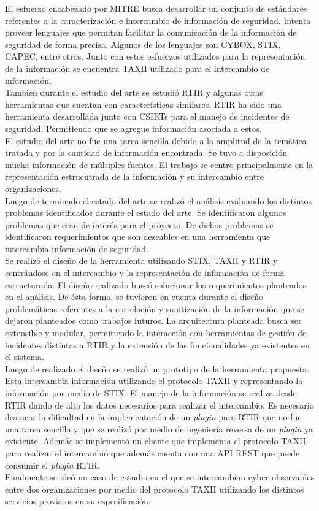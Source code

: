 \bigskip
El esfuerzo encabezado por MITRE busca desarrollar un conjunto de estándares referentes a la caracterización e intercambio de información de seguridad. Intenta proveer lenguajes que permitan facilitar la comunicación de la información de seguridad de forma precisa. Algunos de los lenguajes son CYBOX, STIX, CAPEC, entre otros. Junto con estos esfuerzos utilizados para la representación de la información se encuentra TAXII utilizado para el intercambio de información.\\
\bigskip
También durante el estudio del arte se estudió RTIR y algunas otras herramientas que cuentan con características similares. RTIR ha sido una herramienta desarrollada junto con CSIRTs para el manejo de incidentes de seguridad. Permitiendo que se agregue información asociada a estos.\\
\bigskip
El estudio del arte no fue una tarea sencilla debido a la amplitud de la temática tratada y por la cantidad de información encontrada. Se tuvo a disposición mucha información de múltiples fuentes. El trabajo se centro principalmente en la representación estrucutrada de la información y su intercambio entre organizaciones.\\
\bigskip
Luego de terminado el estado del arte se realizó el análisis evaluando los distintos problemas identificados durante el estado del arte. Se identificaron algunos problemas que eran de interés para el proyecto. De dichos problemas se identificaron requerimientos que son deseables en una herramienta que intercambia información de seguridad.\\
\bigskip
Se realizó el diseño de la herramienta utilizando STIX, TAXII y RTIR y centrándose en el intercambio y la representación de información de forma estructurada. El diseño realizado buscó solucionar los requerimientos planteados en el análisis. De ésta forma, se tuvieron en cuenta durante el diseño problemáticas referentes a la correlación y sanitización de la información que se dejaron planteados como trabajos futuros. La arquitectura planteada busca ser extensible y modular, permitiendo la interacción con herramientas de gestión de incidentes distintas a RTIR y la extensión de las funcionalidades ya existentes en el sistema.\\
\bigskip
Luego de realizado el diseño se realizó un prototipo de la herramienta propuesta. Esta intercambia información utilizando el protocolo TAXII y representando la información por medio de STIX. El manejo de la información se realiza desde RTIR dando de alta los datos necesarios para realizar el intercambio. Es necesario destacar la dificultad en la implementación de un \textit{plugin} para RTIR que no fue una tarea sencilla y que se realizó por medio de ingeniería reversa de un \textit{plugin} ya existente. Además se implementó un cliente que implementa el protocolo TAXII para realizar el intercambió que además cuenta con una API REST que puede consumir el \textit{plugin} RTIR.\\
\bigskip
Finalmente se ideó un caso de estudio en el que se intercambian cyber observables entre dos organizaciones por medio del protocolo TAXII utilizando los distintos servicios provistos en su especificación.


